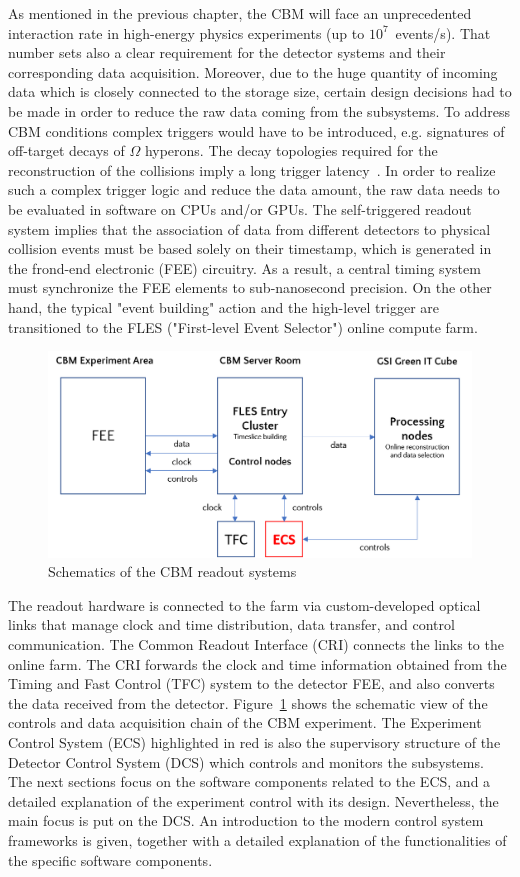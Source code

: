 
As mentioned in the previous chapter, the \gls{CBM} will face an unprecedented interaction rate in high-energy physics experiments (up to $10^{7}$~events/s). That number sets also a clear requirement for the detector systems and their corresponding data acquisition. Moreover, due to the huge quantity of incoming data which is closely connected to the storage size, certain design decisions had to be made in order to reduce the raw data coming from the subsystems. To address \gls{CBM} conditions complex triggers would have to be introduced, e.g. signatures of off-target decays of $\Omega$ hyperons. The decay topologies required for the reconstruction of the collisions imply a long trigger latency~\cite{Friese_2017}. In order to realize such a complex trigger logic and reduce the data amount, the raw data needs to be evaluated in software on \glspl{CPU} and/or \glspl{GPU}. The self-triggered readout system implies that the association of data from different detectors to physical collision events must be based solely on their timestamp, which is generated in the frond-end electronic (\gls{FEE}) circuitry. As a result, a central timing system must synchronize the \gls{FEE} elements to sub-nanosecond precision. On the other hand, the typical "event building" action and the high-level trigger are transitioned to the \gls{FLES} ("First-level Event Selector") online compute farm. 


\begin{figure}[!h]
\centering
\includegraphics[width=0.8\columnwidth]{Chapter3/Controls/images/online.png}
\caption{Schematics of the CBM readout systems}
\label{fig_controls}
\end{figure}

The readout hardware is connected to the farm via custom-developed optical links that manage clock and time distribution, data transfer, and control communication. The Common Readout Interface (\gls{CRI}) connects the links to the online farm. The CRI forwards the clock and time information obtained from the Timing and Fast Control (\gls{TFC}) system to the detector \gls{FEE}, and also converts the data received from the detector. Figure~\ref{fig_controls} shows the schematic view of the controls and data acquisition chain of the \gls{CBM} experiment. The Experiment Control System (\gls{ECS}) highlighted in red is also the supervisory structure of the Detector Control System (\gls{DCS}) which controls and monitors the subsystems. The next sections focus on the software components related to the \gls{ECS}, and a detailed explanation of the experiment control with its design. Nevertheless, the main focus is put on the \gls{DCS}. An introduction to the modern control system frameworks is given, together with a detailed explanation of the functionalities of the specific software components. 
